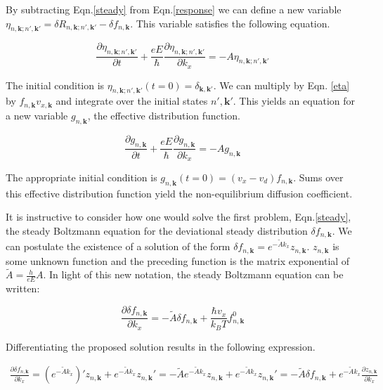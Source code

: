\documentclass[preprint,12pt]{elsarticle}
\begin{document}
\noindent By subtracting Eqn.\ref{steady} from Eqn.\ref{response} we can define a new variable $\eta_{n,\mathbf{k};n',\mathbf{k'}} = \delta R_{n,\mathbf{k};n',\mathbf{k'}} - \delta f_{n,\mathbf{k}}$. This variable satisfies the following equation.

\begin{equation} \label{eta}
    \frac{\partial \eta_{n,\mathbf{k};n',\mathbf{k'}}}{\partial t}+\frac{eE}{\hbar} \frac{\partial \eta_{n,\mathbf{k};n',\mathbf{k'}}}{\partial k_x} = - A \eta_{n,\mathbf{k};n',\mathbf{k'}}
\end{equation}

\noindent The initial condition is $\eta_{n,\mathbf{k};n',\mathbf{k'}}(t=0) = \delta_{\mathbf{k},\mathbf{k'}}$. We can multiply by Eqn. \ref{eta} by $f_{n,\mathbf{k}} v_{x,\mathbf{k}}$ and integrate over the initial states $n',\mathbf{k'}$. This yields an equation for a new variable $g_{n,\mathbf{k}}$, the effective distribution function.

\begin{equation}
    \frac{\partial g_{n,\mathbf{k}}}{\partial t}+\frac{eE}{\hbar} \frac{\partial g_{n,\mathbf{k}}}{\partial k_x} = -A g_{n,\mathbf{k}}
\end{equation}

\noindent The appropriate initial condition is $g_{n,\mathbf{k}}(t=0) = (v_x - v_d) f_{n,\mathbf{k}}$. Sums over this effective distribution function yield the non-equilibrium diffusion coefficient. 

\noindent It is instructive to consider how one would solve the first problem, Eqn.\ref{steady}, the steady Boltzmann equation for the deviational steady distribution $\delta f_{n,\mathbf{k}}$. We can postulate the existence of a solution of the form $\delta f_{n,\mathbf{k}} = e^{- \tilde{A} k_x} z_{n,\mathbf{k}}$. $z_{n,\mathbf{k}}$ is some unknown function and the preceding function is the matrix exponential of $\tilde{A} = \frac{h}{eE} A$. In light of this new notation, the steady Boltzmann equation can be written:

\begin{equation}
    \frac{\partial \delta f_{n,\mathbf{k}}}{\partial k_x} = -\tilde{A} \delta f_{n,\mathbf{k}} + \frac{\hbar v_x}{k_B T} f_{n,\mathbf{k}}^0
\end{equation}

Differentiating the proposed solution results in the following expression.

\begin{multline}
    \frac{\partial \delta f_{n,\mathbf{k}}}{\partial k_x} = (e^{- \tilde{A} k_x})' z_{n,\mathbf{k}} + e^{- \tilde{A} k_x} z_{n,\mathbf{k}}' = -\tilde{A} e^{- \tilde{A} k_x} z_{n,\mathbf{k}} + e^{- \tilde{A} k_x} z_{n,\mathbf{k}}' = -\tilde{A} \delta f_{n,\mathbf{k}} + e^{- \tilde{A} k_x} \frac{\partial z_{n,\mathbf{k}}}{\partial k_x} 
\end{multline}
\end{document}
